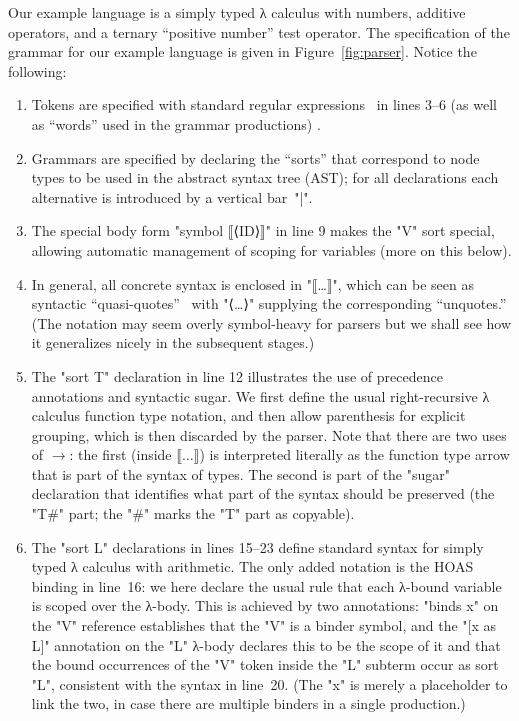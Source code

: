\documentclass[letterpaper]{llncs}
\begin{document}
\begin{example}
  Our example language is a simply typed λ calculus with numbers, additive operators, and a ternary
  ``positive number'' test operator.  The \HAX specification of the grammar for our example language
  is given in Figure~\ref{fig:parser}. Notice the following:
  \begin{enumerate}

  \item Tokens are specified with standard regular expressions~\cite{man:regex} in lines 3--6 (as
    well as ``words'' used in the grammar productions) .

  \item Grammars are specified by declaring the ``sorts'' that correspond to node types to be used
    in the abstract syntax tree (AST); for all declarations each alternative is introduced by a
    vertical bar~"|".

  \item The special body form "symbol ⟦⟨ID⟩⟧" in line 9 makes the "V" sort special, allowing
    automatic management of scoping for variables (more on this below).

  \item In general, all concrete syntax is enclosed in "⟦…⟧", which can be seen as syntactic
    ``quasi-quotes''~\cite{Quine:1940} with "⟨…⟩" supplying the corresponding ``unquotes.'' (The
    notation may seem overly symbol-heavy for parsers but we shall see how it generalizes nicely in
    the subsequent stages.)

  \item The "sort T" declaration in line 12 illustrates the use of precedence annotations and
    syntactic sugar. We first define the usual right-recursive λ calculus function type notation,
    and then allow parenthesis for explicit grouping, which is then discarded by the parser.  Note
    that there are two uses of $→$: the first (inside $⟦…⟧$) is interpreted literally as the
    function type arrow that is part of the syntax of types. The second is part of the "sugar"
    declaration that identifies what part of the syntax should be preserved (the "T#" part; the "#"
    marks the "T" part as copyable).

  \item The "sort L" declarations in lines 15--23 define standard syntax for simply typed λ calculus
    with arithmetic. The only added notation is the HOAS binding in line~16: we here declare the
    usual rule that each λ-bound variable is scoped over the λ-body. This is achieved by two
    annotations: "binds x" on the "V" reference establishes that the "V" is a binder symbol, and the
    "[x as L]" annotation on the "L" λ-body declares this to be the scope of it and that the
    bound occurrences of the "V" token inside the "L" subterm occur as sort "L", consistent with the
    syntax in line~20. (The "x" is merely a placeholder to link the two, in case there are multiple
    binders in a single production.)


\end{enumerate}
\end{example}
\end{document}
